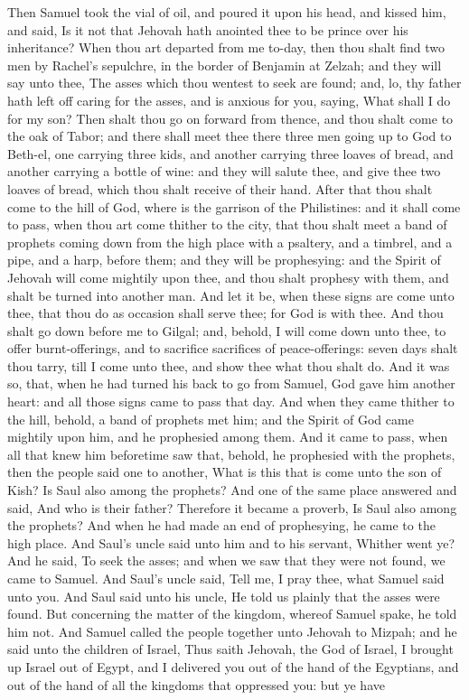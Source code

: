 Then Samuel took the vial of oil, and poured it upon his head, and kissed him, and said, Is it not that Jehovah hath anointed thee to be prince over his inheritance? When thou art departed from me to-day, then thou shalt find two men by Rachel’s sepulchre, in the border of Benjamin at Zelzah; and they will say unto thee, The asses which thou wentest to seek are found; and, lo, thy father hath left off caring for the asses, and is anxious for you, saying, What shall I do for my son? Then shalt thou go on forward from thence, and thou shalt come to the oak of Tabor; and there shall meet thee there three men going up to God to Beth-el, one carrying three kids, and another carrying three loaves of bread, and another carrying a bottle of wine: and they will salute thee, and give thee two loaves of bread, which thou shalt receive of their hand. After that thou shalt come to the hill of God, where is the garrison of the Philistines: and it shall come to pass, when thou art come thither to the city, that thou shalt meet a band of prophets coming down from the high place with a psaltery, and a timbrel, and a pipe, and a harp, before them; and they will be prophesying: and the Spirit of Jehovah will come mightily upon thee, and thou shalt prophesy with them, and shalt be turned into another man. And let it be, when these signs are come unto thee, that thou do as occasion shall serve thee; for God is with thee. And thou shalt go down before me to Gilgal; and, behold, I will come down unto thee, to offer burnt-offerings, and to sacrifice sacrifices of peace-offerings: seven days shalt thou tarry, till I come unto thee, and show thee what thou shalt do.  And it was so, that, when he had turned his back to go from Samuel, God gave him another heart: and all those signs came to pass that day. And when they came thither to the hill, behold, a band of prophets met him; and the Spirit of God came mightily upon him, and he prophesied among them. And it came to pass, when all that knew him beforetime saw that, behold, he prophesied with the prophets, then the people said one to another, What is this that is come unto the son of Kish? Is Saul also among the prophets? And one of the same place answered and said, And who is their father? Therefore it became a proverb, Is Saul also among the prophets? And when he had made an end of prophesying, he came to the high place.  And Saul’s uncle said unto him and to his servant, Whither went ye? And he said, To seek the asses; and when we saw that they were not found, we came to Samuel. And Saul’s uncle said, Tell me, I pray thee, what Samuel said unto you. And Saul said unto his uncle, He told us plainly that the asses were found. But concerning the matter of the kingdom, whereof Samuel spake, he told him not.  And Samuel called the people together unto Jehovah to Mizpah; and he said unto the children of Israel, Thus saith Jehovah, the God of Israel, I brought up Israel out of Egypt, and I delivered you out of the hand of the Egyptians, and out of the hand of all the kingdoms that oppressed you: but ye have 